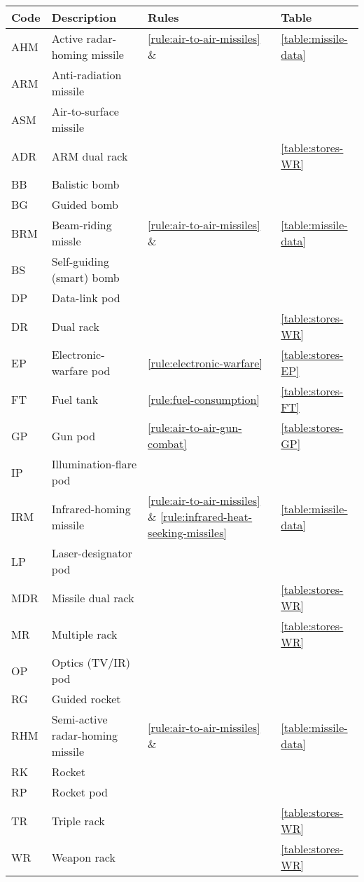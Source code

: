 \begin{twocolumntable}[t]

\begin{tabular}{llll}
\toprule
Code&Description&Rules&Table\\
\midrule
AHM&Active radar-homing missile&\ref{rule:air-to-air-missiles} \& \x{\ref{rule:active-radar-homing-missiles}}{\ref{rule:radar-guided-missiles}}&\ref{table:missile-data}\\
ARM&Anti-radiation missile\\
ASM&Air-to-surface missile\\
ADR&ARM dual rack&&\ref{table:stores-WR}\\
BB&Balistic bomb\\
BG&Guided bomb\\
BRM&Beam-riding missle&\ref{rule:air-to-air-missiles} \& \x{\ref{rule:beam-riding-missiles}}{\ref{rule:radar-guided-missiles}}&\ref{table:missile-data}\\
BS&Self-guiding (smart) bomb\\
DP&Data-link pod\\
DR&Dual rack&&\ref{table:stores-WR}\\
EP&Electronic-warfare pod&\ref{rule:electronic-warfare}&\ref{table:stores-EP}\\
FT&Fuel tank&\ref{rule:fuel-consumption}&\ref{table:stores-FT}\\
GP&Gun pod&\ref{rule:air-to-air-gun-combat}&\ref{table:stores-GP}\\
IP&Illumination-flare pod\\
IRM&Infrared-homing missile&\ref{rule:air-to-air-missiles} \& \ref{rule:infrared-heat-seeking-missiles}&\ref{table:missile-data}\\
LP&Laser-designator pod\\
MDR&Missile dual rack&&\ref{table:stores-WR}\\
MR&Multiple rack&&\ref{table:stores-WR}\\
OP&Optics (TV/IR) pod\\
RG&Guided rocket\\
RHM&Semi-active radar-homing missile&\ref{rule:air-to-air-missiles} \& \x{\ref{rule:semi-active-radar-homing-missiles}}{\ref{rule:radar-guided-missiles}}&\ref{table:missile-data}\\
RK&Rocket\\
RP&Rocket pod\\
TR&Triple rack&&\ref{table:stores-WR}\\
WR&Weapon rack&&\ref{table:stores-WR}\\
\bottomrule
\end{tabular}

\end{twocolumntable}